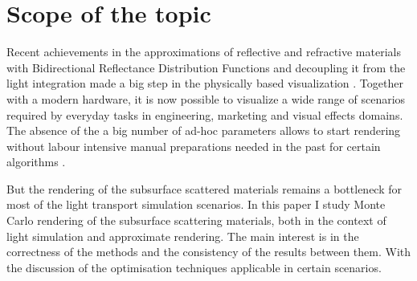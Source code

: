 \section{Scope of the topic}
\label{section:scope}

Recent achievements in the approximations of reflective and refractive materials with Bidirectional
Reflectance Distribution Functions and decoupling it from the light integration made a big step in
the physically based visualization \cite{pharr2010physically}. Together with a modern hardware, it
is now possible to visualize a wide range of scenarios required by everyday tasks in engineering,
marketing and visual effects domains. The absence of the a big number of ad-hoc parameters allows to
start rendering without labour intensive manual preparations needed in the past for certain
algorithms \cite{DBLP:conf/mam/KettnerRSJK15}.

But the rendering of the subsurface scattered materials remains a bottleneck for most of the light
transport simulation scenarios. In this paper I study Monte Carlo rendering of the subsurface
scattering materials, both in the context of light simulation and approximate rendering.
The main interest is in the correctness of the methods and the consistency of the results between
them. With the discussion of the optimisation techniques applicable in certain scenarios.

